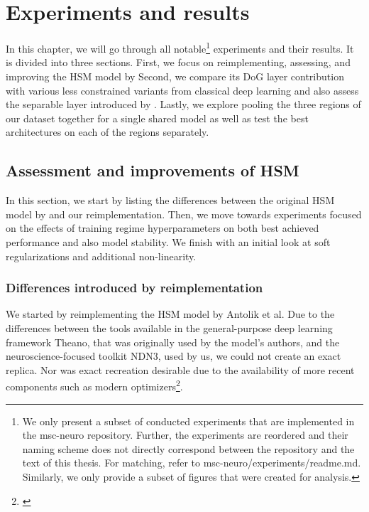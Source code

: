 \renewcommand*\thesubsubsection{\arabic{section}.\arabic{subsection}.\arabic{subsubsection}}
\setlength{\abovecaptionskip}{0pt plus 0pt minus 0pt} %

\chapter{Experiments and results}\label{ch:5}

In this chapter, we will go through all notable\footnote{We only present a subset of conducted experiments that are implemented in the msc-neuro repository. Further, the experiments are reordered and their naming scheme does not directly correspond between the repository and the text of this thesis. For matching, refer to msc-neuro/experiments/readme.md. Similarly, we only provide a subset of figures that were created for analysis.} experiments and their results. It is divided into three sections. First, we focus on reimplementing, assessing, and improving the HSM model by \cite{antolik} Second, we compare its DoG layer contribution with various less constrained variants from classical deep learning and also assess the separable layer introduced by \cite{klindt}. Lastly, we explore pooling the three regions of our dataset together for a single shared model as well as test the best architectures on each of the regions separately.


\section{Assessment and improvements of HSM}

In this section, we start by listing the differences between the original HSM model by \citeauthor{antolik} and our reimplementation. Then, we move towards experiments focused on the effects of training regime hyperparameters on both best achieved performance and also model stability. We finish with an initial look at soft regularizations and additional non-linearity.

\addtocounter{subsection}{-1} %
\subsection{Differences introduced by reimplementation}\label{ch:5.1.0}

We started by reimplementing the HSM model by Antolik et al. Due to the differences between the tools available in the general-purpose deep learning framework Theano, that was originally used by the model’s authors, and the neuroscience-focused toolkit NDN3, used by us, we could not create an exact replica. Nor was exact recreation desirable due to the availability of more recent components such as modern optimizers\footnote{\citep{2016arXiv160904747R}}.

